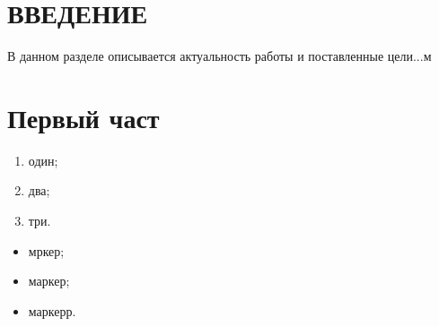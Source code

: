 \documentclass[paper=a4, fontsize=14pt, pagesize, DIV=calc, oneside]{scrreport}
\begin{document}
\pagestyle{empty} 



\newpage
\tableofcontents
\newpage

\pagestyle{plain}
\setcounter{page}{2} 



\chapter*{ВВЕДЕНИЕ}











В данном разделе описывается актуальность работы и поставленные цели...м





\chapter{Первый част}









\begin{enumerate}

    \item один;

    \item два;

    \item три.

\end{enumerate}


\begin{itemize}

    \item мркер;

    \item маркер;

    \item маркерр.

\end{itemize}
\end{document}
